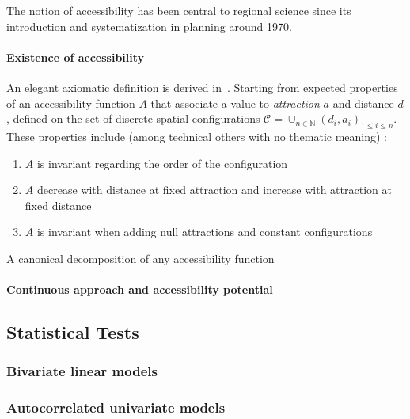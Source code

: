 The notion of accessibility has been central to regional science since its introduction and systematization in planning around 1970. 

\paragraph{Existence of accessibility}

An elegant axiomatic definition is derived in~\cite{weibull1976axiomatic}. Starting from expected properties of an accessibility function $A$ that associate a value to \emph{attraction} $a$ and distance $d$, defined on the set of discrete spatial configurations $\mathcal{C} = \cup_{n\in \mathbb{N}}{(d_i,a_i)_{1\leq i \leq n}}$. These properties include (among technical others with no thematic meaning) :
\begin{enumerate}
\item $A$ is invariant regarding the order of the configuration
\item $A$ decrease with distance at fixed attraction and increase with attraction at fixed distance
\item $A$ is invariant when adding null attractions and constant configurations
\end{enumerate}

A canonical decomposition of any accessibility function 


\paragraph{Continuous approach and accessibility potential}







\subsection{Statistical Tests}


\subsubsection{Bivariate linear models}

\subsubsection{Autocorrelated univariate models}

